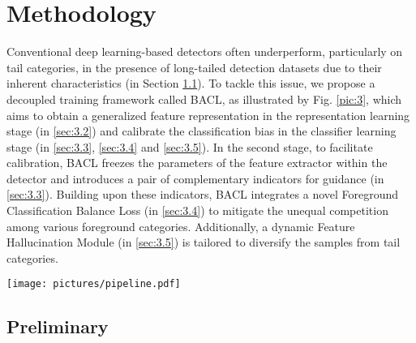 \documentclass[lettersize,journal]{IEEEtran}
\begin{document}
\section{Methodology}

Conventional deep learning-based detectors often underperform, particularly on tail categories, in the presence of long-tailed detection datasets due to their inherent characteristics (in Section \ref{sec:3.1}).
To tackle this issue, we propose a decoupled training framework called BACL, as illustrated by Fig. \ref{pic:3}, which aims to obtain a generalized feature representation in the representation learning stage (in \ref{sec:3.2}) and calibrate the classification bias in the classifier learning stage (in \ref{sec:3.3}, \ref{sec:3.4} and \ref{sec:3.5}). 
In the second stage, to facilitate calibration, BACL freezes the parameters of the feature extractor within the detector and introduces a pair of complementary indicators for guidance (in \ref{sec:3.3}).
Building upon these indicators, BACL integrates a novel Foreground Classification Balance Loss (in \ref{sec:3.4}) to mitigate the unequal competition among various foreground categories.
Additionally, a dynamic Feature Hallucination Module (in \ref{sec:3.5}) is tailored to diversify the samples from tail categories.

\begin{figure*}
  \centering
  \texttt{[image: pictures/pipeline.pdf]}
  \caption{Overall framework of the proposed BACL. In the first stage (left panel), the entire object detector is trained on the long-tailed dataset for 12 epochs. In the second stage (right panel), we freeze the parameters of the feature extractor (green blocks), and fine-tune other parts (blue blocks) with our proposed foreground classification balance loss and feature hallucination module for another 12 epochs. Notably, LTI and STI stand for long-term indicators and short-term indicators, respectively.}
  \label{pic:3}
\end{figure*}





\subsection{Preliminary}\label{sec:3.1}
\end{document}
